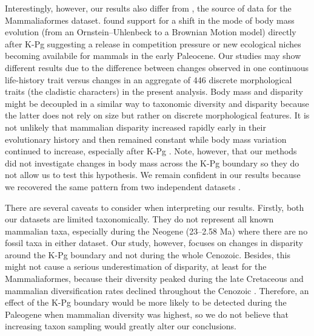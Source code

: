 \documentclass[10pt,letterpaper]{article}
\begin{document}
Interestingly, however, our results also differ from \cite{Slater2012MEE}, the source of data for the Mammaliaformes dataset.
\cite{Slater2012MEE} found support for a shift in the mode of body mass evolution (from an Ornstein--Uhlenbeck to a Brownian Motion model) directly after K-Pg suggesting a release in competition pressure or new ecological niches becoming availabile for mammals in the early Paleocene.
Our studies may show different results due to the difference between changes observed in one continuous life-history trait \citep[body mass;][]{Slater2012MEE} versus changes in an aggregate of 446 discrete morphological traits (the cladistic characters) in the present analysis.
Body mass and disparity might be decoupled in a similar way to taxonomic diversity and disparity \citep[e.g.][]{slaterCetacean,ruta2013,hopkinsdecoupling2013} because the latter does not rely on size but rather on discrete morphological features.
It is not unlikely that mammalian disparity increased rapidly early in their evolutionary history and then remained constant \citep[Fig \ref{fig:Fig_Raw_results};][]{Close2015,Lee2015R759} while body mass variation continued to increase, especially after K-Pg \citep{Slater2012MEE}.
Note, however, that our methods did not investigate changes in body mass across the K-Pg boundary so they do not allow us to test this hypothesis.
We remain confident in our results because we recovered the same pattern from two independent datasets \citep{Slater2012MEE,beckancient2014}.

There are several caveats to consider when interpreting our results. 
Firstly, both our datasets are limited taxonomically.
They do not represent all known mammalian taxa, especially during the Neogene (23--2.58 Ma) where there are no fossil taxa in either dataset.
Our study, however, focuses on changes in disparity around the K-Pg boundary and not during the whole Cenozoic.
Besides, this might not cause a serious underestimation of disparity, at least for the Mammaliaformes, because their diversity peaked during the late Cretaceous \citep[Campanian; 72.1--83.6 Ma;][]{Newham201432} and mammalian diversification rates declined throughout the Cenozoic \citep{Raia2012}.
Therefore, an effect of the K-Pg boundary would be more likely to be detected during the Paleogene when mammalian diversity was highest, so we do not believe that increasing taxon sampling would greatly alter our conclusions.
\end{document}

